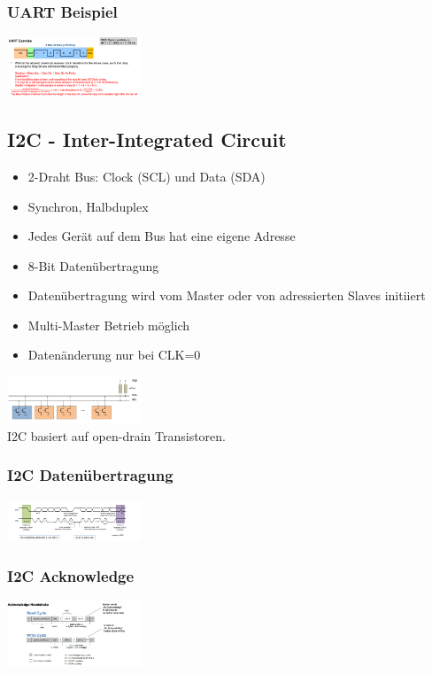 \subsubsection{UART Beispiel}
\includegraphics[width=0.3\textwidth]{sections/images/uart_example.png}

\subsection{I2C - Inter-Integrated Circuit}
\begin{itemize}
    \item 2-Draht Bus: Clock (SCL) und Data (SDA)
    \item Synchron, Halbduplex
    \item Jedes Gerät auf dem Bus hat eine eigene Adresse
    \item 8-Bit Datenübertragung
    \item Datenübertragung wird vom Master oder von adressierten Slaves initiiert
    \item Multi-Master Betrieb möglich
    \item Datenänderung nur bei CLK=0
\end{itemize}
\includegraphics[width=0.3\textwidth]{sections/images/i2c.png}\\
I2C basiert auf open-drain Transistoren.
\subsubsection{I2C Datenübertragung}
\includegraphics[width=0.3\textwidth]{sections/images/i2c_transfer.png}

\subsubsection{I2C Acknowledge}
\includegraphics[width=0.3\textwidth]{sections/images/i2c_ack.png}

